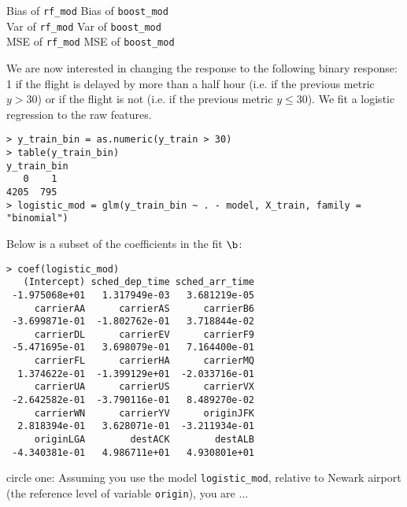 \documentclass[12pt]{article}
\begin{document}
\begin{enumerate}[(aa)]
Bias of \texttt{rf\_mod}   \iftoggle{solutions}{\inred{$?$}}{~\line(1,0){15}~}      Bias of \texttt{boost\_mod} \\

Var of \texttt{rf\_mod}   \iftoggle{solutions}{\inred{$?$}}{~\line(1,0){15}~}     Var of \texttt{boost\_mod} \\

MSE of \texttt{rf\_mod}   \iftoggle{solutions}{\inred{$?$}}{~\line(1,0){15}~}     MSE of \texttt{boost\_mod} \\

\iftoggle{solutions}{\inred{= is also acceptable for the last question if you assume $M$ was optimized}}{}
\pagebreak


We are now interested in changing the response to the following binary response: 1 if the flight is delayed by more than a half hour (i.e. if the previous metric $y > 30$) or if the flight is not (i.e. if the previous metric $y \leq 30$). We fit a logistic regression to the raw features. 

\begin{Verbatim}[fontsize=\small]
> y_train_bin = as.numeric(y_train > 30)
> table(y_train_bin)
y_train_bin
   0    1 
4205  795
> logistic_mod = glm(y_train_bin ~ . - model, X_train, family = "binomial")
\end{Verbatim}

Below is a subset of the coefficients in the fit $\b$:

\begin{Verbatim}[fontsize=\small]
> coef(logistic_mod)
   (Intercept) sched_dep_time sched_arr_time 
 -1.975068e+01   1.317949e-03   3.681219e-05 
     carrierAA      carrierAS      carrierB6 
 -3.699871e-01  -1.802762e-01   3.718844e-02 
     carrierDL      carrierEV      carrierF9 
 -5.471695e-01   3.698079e-01   7.164400e-01 
     carrierFL      carrierHA      carrierMQ 
  1.374622e-01  -1.399129e+01  -2.033716e-01 
     carrierUA      carrierUS      carrierVX 
 -2.642582e-01  -3.790116e-01   8.489270e-02 
     carrierWN      carrierYV      originJFK 
  2.818394e-01   3.628071e-01  -3.211934e-01  
     originLGA        destACK        destALB 
 -4.340381e-01   4.986711e+01   4.930801e+01 
\end{Verbatim}


 circle one: Assuming you use the model \texttt{logistic\_mod}, relative to Newark airport (the reference level of variable \texttt{origin}), you are ... \\


\end{enumerate}
\end{document}
